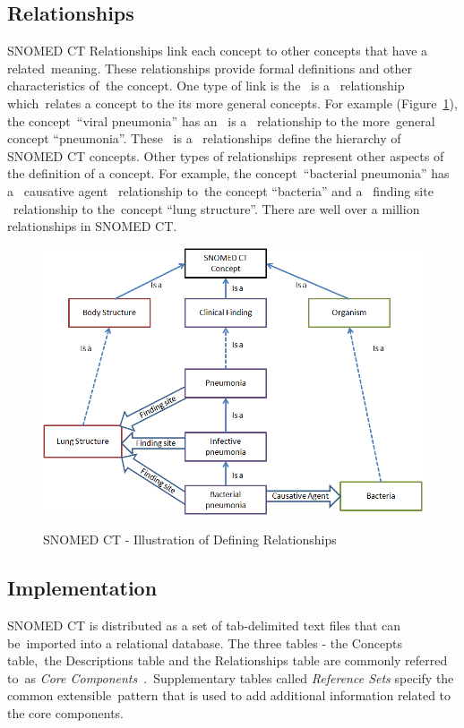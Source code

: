 \documentclass[DIV=calc, paper=a4, fontsize=12pt, onecolumn]{scrartcl}	 %
\begin{document}
  \subsection{Relationships}
  SNOMED CT Relationships link each concept to other concepts that have a related\
  meaning. These relationships provide formal definitions and other characteristics of\
  the concept. One type of link is the \textbar ~is a \textbar ~relationship which\
  relates a concept to the its more general concepts. For example (Figure~\ref{fig:snomedct_relationships}), the concept\
  ``viral pneumonia'' has an \textbar ~is a \textbar ~relationship to the more\
  general concept ``pneumonia''. These \textbar ~is a \textbar ~relationships\
  define the hierarchy of SNOMED CT concepts. Other types of relationships\
  represent other aspects of the definition of a concept. For example, the concept\
  ``bacterial pneumonia'' has a \textbar ~causative agent \textbar ~relationship to\
  the concept ``bacteria'' and a \textbar ~finding site \textbar ~relationship to the\
  concept ``lung structure''. There are well over a million relationships in SNOMED CT.
  \begin{figure}[!ht]
    \centering
    \includegraphics[scale=0.5]{defining_relationship_example1.png}
    \caption{SNOMED CT - Illustration of Defining Relationships}\cite[Fig.~7]{snomed_-_user_guide_snomed_2011}
    \label{fig:snomedct_relationships}
  \end{figure}

\subsection{Implementation}
  SNOMED CT is distributed as a set of tab-delimited text files that can be\
  imported into a relational database. The three tables - the Concepts table,\
  the Descriptions table and the Relationships table are commonly referred to\
  as \emph{Core Components}~\cite{snomed_implementation_guide_snomed_2011}.\
  Supplementary tables called \emph{Reference Sets} specify the common extensible\
  pattern that is used to add additional information related to the core components.
\end{document}
